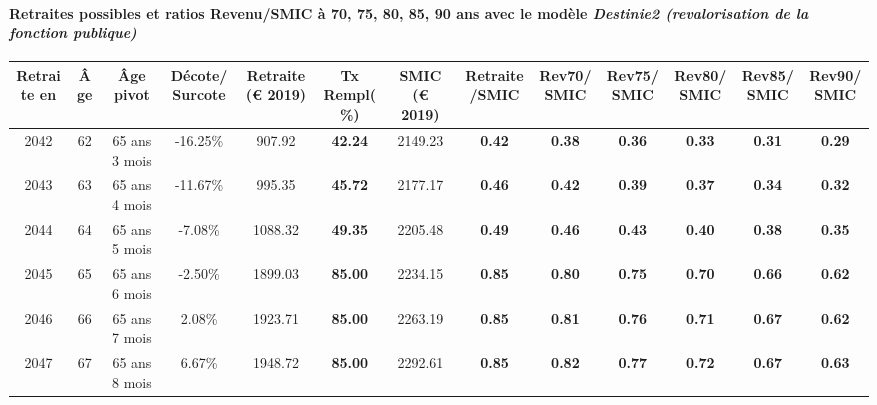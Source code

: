 \paragraph{Retraites possibles et ratios Revenu/SMIC à 70, 75, 80, 85, 90 ans avec le modèle \emph{Destinie2 (revalorisation de la fonction publique)}}  
 
{ \scriptsize \begin{center} 
\begin{tabular}[htb]{|c|c||c|c||c|c||c||c|c|c|c|c|c|} 
\hline 
 Retraite en &  Âge &  Âge pivot &  Décote/Surcote &  Retraite (\euro{} 2019) &  Tx Rempl(\%) &  SMIC (\euro{} 2019) &  Retraite/SMIC &  Rev70/SMIC &  Rev75/SMIC &  Rev80/SMIC &  Rev85/SMIC &  Rev90/SMIC \\ 
\hline \hline 
 2042 &  62 &  65 ans 3 mois &  -16.25\% &  907.92 &  {\bf 42.24} &  2149.23 &  {\bf {\color{red} 0.42}} &  {\bf {\color{red} 0.38}} &  {\bf {\color{red} 0.36}} &  {\bf {\color{red} 0.33}} &  {\bf {\color{red} 0.31}} &  {\bf {\color{red} 0.29}} \\ 
\hline 
 2043 &  63 &  65 ans 4 mois &  -11.67\% &  995.35 &  {\bf 45.72} &  2177.17 &  {\bf {\color{red} 0.46}} &  {\bf {\color{red} 0.42}} &  {\bf {\color{red} 0.39}} &  {\bf {\color{red} 0.37}} &  {\bf {\color{red} 0.34}} &  {\bf {\color{red} 0.32}} \\ 
\hline 
 2044 &  64 &  65 ans 5 mois &  -7.08\% &  1088.32 &  {\bf 49.35} &  2205.48 &  {\bf {\color{red} 0.49}} &  {\bf {\color{red} 0.46}} &  {\bf {\color{red} 0.43}} &  {\bf {\color{red} 0.40}} &  {\bf {\color{red} 0.38}} &  {\bf {\color{red} 0.35}} \\ 
\hline 
 2045 &  65 &  65 ans 6 mois &  -2.50\% &  1899.03 &  {\bf 85.00} &  2234.15 &  {\bf {\color{red} 0.85}} &  {\bf {\color{red} 0.80}} &  {\bf {\color{red} 0.75}} &  {\bf {\color{red} 0.70}} &  {\bf {\color{red} 0.66}} &  {\bf {\color{red} 0.62}} \\ 
\hline 
 2046 &  66 &  65 ans 7 mois &  2.08\% &  1923.71 &  {\bf 85.00} &  2263.19 &  {\bf {\color{red} 0.85}} &  {\bf {\color{red} 0.81}} &  {\bf {\color{red} 0.76}} &  {\bf {\color{red} 0.71}} &  {\bf {\color{red} 0.67}} &  {\bf {\color{red} 0.62}} \\ 
\hline 
 2047 &  67 &  65 ans 8 mois &  6.67\% &  1948.72 &  {\bf 85.00} &  2292.61 &  {\bf {\color{red} 0.85}} &  {\bf {\color{red} 0.82}} &  {\bf {\color{red} 0.77}} &  {\bf {\color{red} 0.72}} &  {\bf {\color{red} 0.67}} &  {\bf {\color{red} 0.63}} \\ 
\hline 
\hline 
\end{tabular} 
\end{center} } 

